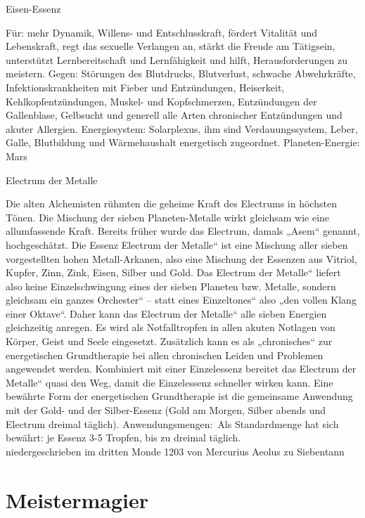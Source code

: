 \documentclass[a5paper,8pt]{book}
\begin{document}
\noindent Eisen-Essenz\

Für: mehr Dynamik, Willens- und Entschlusskraft, fördert Vitalität und Lebenskraft, regt das sexuelle Verlangen an, stärkt die Freude am Tätigsein, unterstützt Lernbereitschaft 
und Lernfähigkeit und hilft, Herausforderungen zu meistern. Gegen: Störungen des Blutdrucks, Blutverlust, schwache Abwehrkräfte, Infektionskrankheiten mit Fieber und 
Entzündungen, Heiserkeit, Kehlkopfentzündungen, Muskel- und Kopfschmerzen, Entzündungen der Gallenblase, Gelbsucht und generell alle Arten chronischer Entzündungen und 
akuter Allergien. Energiesystem: Solarplexus, ihm sind Verdauungssystem, Leber, Galle, Blutbildung und Wärmehaushalt energetisch zugeordnet.
Planeten-Energie: Mars
 
\noindent Electrum der Metalle\

Die alten Alchemisten rühmten die geheime Kraft des Electrums in höchsten Tönen. Die Mischung der sieben Planeten-Metalle wirkt gleichsam wie eine allumfassende Kraft. 
Bereits früher wurde das Electrum, damals „Asem“ genannt, hochgeschätzt. Die Essenz Electrum der Metalle“ ist eine Mischung aller sieben vorgestellten hohen Metall-Arkanen, 
also eine Mischung der Essenzen aus Vitriol, Kupfer, Zinn, Zink, Eisen, Silber und Gold. Das Electrum der Metalle“ liefert also keine Einzelschwingung eines der sieben 
Planeten bzw. Metalle, sondern gleichsam ein ganzes Orchester“ – statt eines Einzeltones“ also „den vollen Klang einer Oktave“. Daher kann das Electrum der Metalle“ alle 
sieben Energien gleichzeitig anregen. Es wird als Notfalltropfen in allen akuten Notlagen von Körper, Geist und Seele eingesetzt. Zusätzlich kann es als „chronisches“ zur 
energetischen Grundtherapie bei allen chronischen Leiden und Problemen angewendet werden.
Kombiniert mit einer Einzelessenz bereitet das Electrum der Metalle“ quasi den Weg, damit die Einzelessenz schneller wirken kann. Eine bewährte Form der energetischen 
Grundtherapie ist die gemeinsame Anwendung mit der Gold- und der Silber-Essenz (Gold am Morgen, Silber abends und Electrum dreimal täglich).
Anwendungsmengen:\
Als Standardmenge hat sich bewährt: je Essenz 3-5 Tropfen, bis zu dreimal täglich.\\

niedergeschrieben im dritten Monde 1203 von Mercurius Aeolus zu Siebentann

\newpage

\section{Meistermagier}
\end{document}
